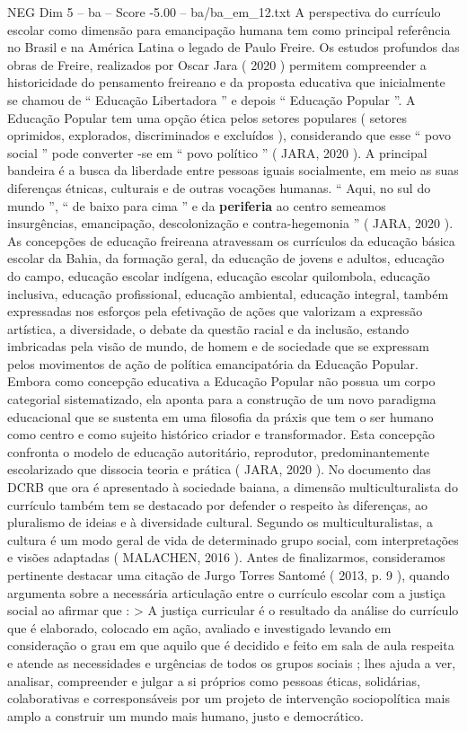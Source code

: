 \begin{textsample}{NEG Dim 5 – ba – Score -5.00 – ba/ba\_em\_12.txt}
A perspectiva do currículo escolar como dimensão para emancipação humana tem como principal referência no Brasil e na América Latina o legado de Paulo Freire.
Os estudos profundos das obras de Freire, realizados por Oscar Jara ( 2020 ) permitem compreender a historicidade do pensamento freireano e da proposta educativa que inicialmente se chamou de “ Educação Libertadora ” e depois “ Educação Popular ”.
A Educação Popular tem uma opção ética pelos setores populares ( setores oprimidos, explorados, discriminados e excluídos ), considerando que esse “ povo social ” pode converter -se em “ povo político ” ( JARA, 2020 ).
A principal bandeira é a busca da liberdade entre pessoas iguais socialmente, em meio as suas diferenças étnicas, culturais e de outras vocações humanas. “ Aqui, no sul do mundo ”, “ de baixo para cima ” e da \textbf{periferia} ao centro semeamos insurgências, emancipação, descolonização e contra-hegemonia ” ( JARA, 2020 ).
As concepções de educação freireana atravessam os currículos da educação básica escolar da Bahia, da formação geral, da educação de jovens e adultos, educação do campo, educação escolar indígena, educação escolar quilombola, educação inclusiva, educação profissional, educação ambiental, educação integral, também expressadas nos esforços pela efetivação de ações que valorizam a expressão artística, a diversidade, o debate da questão racial e da inclusão, estando imbricadas pela visão de mundo, de homem e de sociedade que se expressam pelos movimentos de ação de política emancipatória da Educação Popular.
Embora como concepção educativa a Educação Popular não possua um corpo categorial sistematizado, ela aponta para a construção de um novo paradigma educacional que se sustenta em uma filosofia da práxis que tem o ser humano como centro e como sujeito histórico criador e transformador.
Esta concepção confronta o modelo de educação autoritário, reprodutor, predominantemente escolarizado que dissocia teoria e prática ( JARA, 2020 ).
No documento das DCRB que ora é apresentado à sociedade baiana, a dimensão multiculturalista do currículo também tem se destacado por defender o respeito às diferenças, ao pluralismo de ideias e à diversidade cultural.
Segundo os multiculturalistas, a cultura é um modo geral de vida de determinado grupo social, com interpretações e visões adaptadas ( MALACHEN, 2016 ).
Antes de finalizarmos, consideramos pertinente destacar uma citação de Jurgo Torres Santomé ( 2013, p. 9 ), quando argumenta sobre a necessária articulação entre o currículo escolar com a justiça social ao afirmar que : > A justiça curricular é o resultado da análise do currículo que é elaborado, colocado em ação, avaliado e investigado levando em consideração o grau em que aquilo que é decidido e feito em sala de aula respeita e atende as necessidades e urgências de todos os grupos sociais ; lhes ajuda a ver, analisar, compreender e julgar a si próprios como pessoas éticas, solidárias, colaborativas e corresponsáveis por um projeto de intervenção sociopolítica mais amplo a construir um mundo mais humano, justo e democrático.

\end{textsample}

